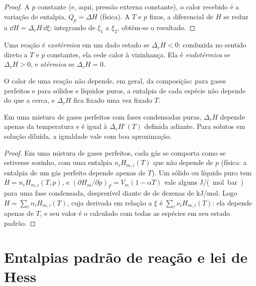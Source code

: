 \begin{proof}
A $p$ constante (e, aqui, pressão externa constante), o calor recebido
é a variação de entalpia, $Q_p = \Delta H$ (física). A $T$ e $p$ fixos,
a diferencial de $H$ se reduz a $\dd H = \Delta_r H\,\dd\xi$; integrando
de $\xi_1$ a $\xi_2$, obtém-se o resultado.
\end{proof}

\begin{definition}\label{def:b2:reaction-enthalpy:exothermic}
Uma reação é \emph{exotérmica} em um dado estado se
$\Delta_r H < 0$: conduzida no sentido direto a $T$ e $p$ constantes, ela
cede calor à vizinhança. Ela é \emph{endotérmica} se $\Delta_r H >
0$, e \emph{atérmica} se $\Delta_r H = 0$.
\end{definition}

O calor de uma reação não depende, em geral, da composição: para gases
perfeitos e para sólidos e líquidos puros, a entalpia de cada espécie não
depende do que a cerca, e $\Delta_r H$ fica fixado
uma vez fixado $T$.

\begin{proposition}\label{prop:b2:reaction-enthalpy:ideal}
Em uma mistura de gases perfeitos com fases condensadas puras, $\Delta_r H$
depende apenas da temperatura e é igual à 
$\Delta_r H^\circ(T)$ definida adiante. Para solutos em solução diluída,
a igualdade vale com boa aproximação.
\end{proposition}

\begin{proof}
Em uma mistura de gases perfeitos, cada gás se comporta como se estivesse
sozinho, com uma entalpia
$n_iH_{m,i}(T)$ que não depende de $p$ (física: a entalpia de um gás
perfeito depende apenas de $T$). Um sólido ou líquido puro tem $H = n_iH_{m,i}(T,
p)$, e $(\partial H_m/\partial p)_T = V_m(1 - \alpha T)$ vale alguns
\unit{J/(mol.bar)} para uma fase condensada, desprezível diante de  de dezenas de \unit{kJ/mol}. Logo $H = \sum_in_iH_{m,i}(T)$, cuja
derivada em relação a $\xi$ é $\sum_i\nu_iH_{m,i}(T)$: ela depende apenas de
$T$, e seu valor é o calculado com todas as espécies em seu
estado padrão.
\end{proof}

\section{Entalpias padrão de reação e lei de Hess}

